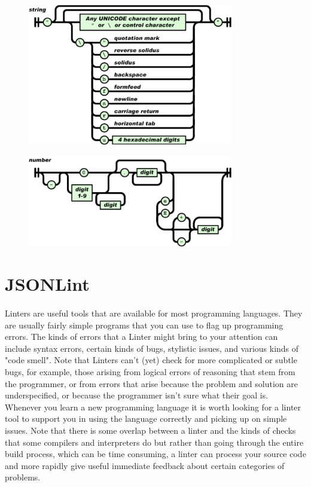 \begin{figure}[H]
\centering
\includegraphics[width=0.8\textwidth]{figures/json-string}
\label{fig:json-string}
\caption{}
\end{figure}

\begin{figure}[H]
\centering
\includegraphics[width=0.8\textwidth]{figures/json-number}
\label{fig:json-number}
\caption{}
\end{figure}



\section{JSONLint}
\paragraph{} Linters are useful tools that are available for most programming languages. They are usually fairly simple programs that you can use to flag up programming errors. The kinds of errors that a Linter might bring to your attention can include syntax errors, certain kinds of bugs, stylistic issues, and various kinds of "code smell". Note that Linters can't (yet) check for more complicated or subtle bugs, for example, those arising from logical errors of reasoning that stem from the programmer, or from errors that arise because the problem and solution are underspecified, or because the programmer isn't sure what their goal is. Whenever you learn a new programming language it is worth looking for a linter tool to support you in using the language correctly and picking up on simple issues. Note that there is some overlap between a linter and the kinds of checks that some compilers and interpreters do but rather than going through the entire build process, which can be time consuming, a linter can process your source code and more rapidly give useful immediate feedback about certain categories of problems.
